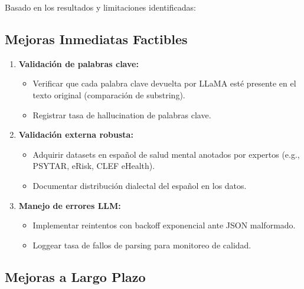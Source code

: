 Basado en los resultados y limitaciones identificadas:

\subsection{Mejoras Inmediatas Factibles}

\begin{enumerate}
    \item \textbf{Validación de palabras clave:}
    \begin{itemize}
        \item Verificar que cada palabra clave devuelta por LLaMA esté presente en el
              texto original (comparación de substring).
        \item Registrar tasa de hallucination de palabras clave.
    \end{itemize}

    \item \textbf{Validación externa robusta:}
    \begin{itemize}
        \item Adquirir datasets en español de salud mental anotados por expertos
              (e.g., PSYTAR, eRisk, CLEF eHealth).
        \item Documentar distribución dialectal del español en los datos.
    \end{itemize}

    \item \textbf{Manejo de errores LLM:}
    \begin{itemize}
        \item Implementar reintentos con backoff exponencial ante JSON malformado.
        \item Loggear tasa de fallos de parsing para monitoreo de calidad.
    \end{itemize}
\end{enumerate}

\subsection{Mejoras a Largo Plazo}

